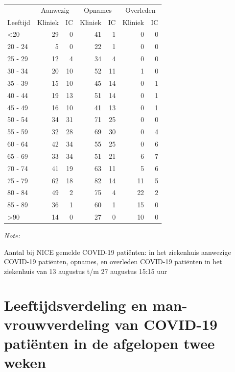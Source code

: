 \documentclass[
  english,
  man,floatsintext]{apa6}
\begin{document}
\begin{table}
\centering\begingroup\fontsize{10}{12}\selectfont

\begin{threeparttable}
\begin{tabular}{lrrrrrr}
\toprule
\multicolumn{1}{c}{ } & \multicolumn{2}{c}{Aanwezig} & \multicolumn{2}{c}{Opnames} & \multicolumn{2}{c}{Overleden} \\
\cmidrule(l{3pt}r{3pt}){2-3} \cmidrule(l{3pt}r{3pt}){4-5} \cmidrule(l{3pt}r{3pt}){6-7}
Leeftijd & Kliniek & IC & Kliniek & IC & Kliniek & IC\\
\midrule
<20 & 29 & 0 & 41 & 1 & 0 & 0\\
20 - 24 & 5 & 0 & 22 & 1 & 0 & 0\\
25 - 29 & 12 & 4 & 34 & 4 & 0 & 0\\
30 - 34 & 20 & 10 & 52 & 11 & 1 & 0\\
35 - 39 & 15 & 10 & 45 & 14 & 0 & 1\\
40 - 44 & 19 & 13 & 51 & 14 & 0 & 1\\
45 - 49 & 16 & 10 & 41 & 13 & 0 & 1\\
50 - 54 & 34 & 31 & 71 & 25 & 0 & 0\\
55 - 59 & 32 & 28 & 69 & 30 & 0 & 4\\
60 - 64 & 42 & 34 & 55 & 25 & 0 & 6\\
65 - 69 & 33 & 34 & 51 & 21 & 6 & 7\\
70 - 74 & 41 & 19 & 63 & 11 & 5 & 6\\
75 - 79 & 62 & 18 & 82 & 14 & 11 & 5\\
80 - 84 & 49 & 2 & 75 & 4 & 22 & 2\\
85 - 89 & 36 & 1 & 60 & 1 & 15 & 0\\
>90 & 14 & 0 & 27 & 0 & 10 & 0\\
\bottomrule
\end{tabular}
\begin{tablenotes}
\item \textit{Note: } 
\item Aantal bij NICE gemelde COVID-19 patiënten: in het ziekenhuis aanwezige COVID-19 patiënten, opnames, en overleden COVID-19 patiënten in het ziekenhuis van 13 augustus t/m 27 augustus 15:15 uur
\end{tablenotes}
\end{threeparttable}
\endgroup{}
\end{table}

\newpage

\hypertarget{leeftijdsverdeling-en-man-vrouwverdeling-van-covid-19-patiuxebnten-in-de-afgelopen-twee-weken}{%
\section{Leeftijdsverdeling en man-vrouwverdeling van COVID-19 patiënten in de afgelopen twee weken}\label{leeftijdsverdeling-en-man-vrouwverdeling-van-covid-19-patiuxebnten-in-de-afgelopen-twee-weken}}
\end{document}
